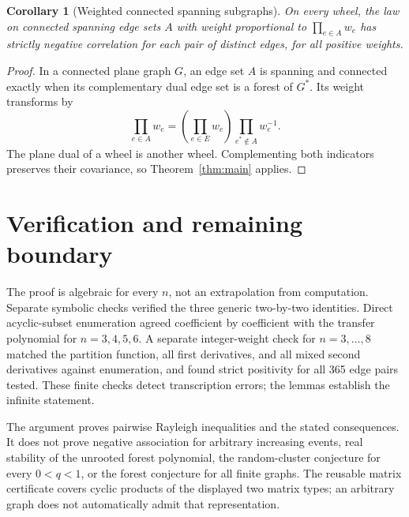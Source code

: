 \documentclass[11pt]{article}
\newtheorem{corollary}[theorem]{Corollary}
\begin{document}
\begin{corollary}[Weighted connected spanning subgraphs]
On every wheel, the law on connected spanning edge sets $A$ with weight proportional to $\prod_{e\in A}w_e$ has strictly negative correlation for each pair of distinct edges, for all positive weights.
\end{corollary}
\begin{proof}
In a connected plane graph $G$, an edge set $A$ is spanning and connected exactly when its complementary dual edge set is a forest of $G^*$. Its weight transforms by
\[
 \prod_{e\in A}w_e=\left(\prod_{e\in E}w_e\right)
 \prod_{e^*\notin A}w_e^{-1}.
\]
The plane dual of a wheel is another wheel. Complementing both indicators preserves their covariance, so Theorem~\ref{thm:main} applies.
\end{proof}

\section{Verification and remaining boundary}
The proof is algebraic for every $n$, not an extrapolation from computation. Separate symbolic checks verified the three generic two-by-two identities. Direct acyclic-subset enumeration agreed coefficient by coefficient with the transfer polynomial for $n=3,4,5,6$. A separate integer-weight check for $n=3,\ldots,8$ matched the partition function, all first derivatives, and all mixed second derivatives against enumeration, and found strict positivity for all 365 edge pairs tested. These finite checks detect transcription errors; the lemmas establish the infinite statement.

The argument proves pairwise Rayleigh inequalities and the stated consequences. It does not prove negative association for arbitrary increasing events, real stability of the unrooted forest polynomial, the random-cluster conjecture for every $0<q<1$, or the forest conjecture for all finite graphs. The reusable matrix certificate covers cyclic products of the displayed two matrix types; an arbitrary graph does not automatically admit that representation.
\end{document}
